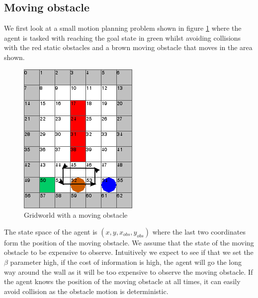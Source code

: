 \subsection{Moving obstacle}
We first look at a small motion planning problem shown in figure \ref{fig:exp1} where the agent is tasked with reaching the goal state in green whilst avoiding collisions with the red static obstacles and a brown moving obstacle that moves in the area shown.
\begin{figure}
\centering
\includegraphics[scale = 0.5]{mdp_moveobs.png}
\caption{Gridworld with a moving obstacle}\label{fig:exp1}
\end{figure}
The state space of the agent is $(x,y,x_{obs},y_{obs})$ where the last two coordinates form the position of the moving obstacle. We assume that the state of the moving obstacle to be expensive to observe. Intuitively we expect to see if that we set the $\beta$ parameter high, \ie if the cost of information is high, the agent will go the long way around the wall as it will be too expensive to observe the moving obstacle. If the agent knows the position of the moving obstacle at all times, it can easily avoid collision as the obstacle motion is deterministic.

